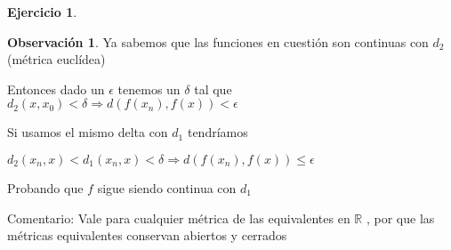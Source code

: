 \documentclass[11pt]{report}
\newcommand{\R}{\mathbb{R}}
\newcommand{\Ra}{\Rightarrow}
\theoremstyle{definition}
\newtheorem*{remark}{Observación}
\newtheorem{ej}{Ejercicio}
\begin{document}
\begin{ej}
\begin{enumerate}
\begin{remark}
				Ya sabemos que las funciones en cuestión son continuas con $d_2$ (métrica euclídea)

				Entonces dado un $\epsilon$ tenemos un $\delta$ tal que $d_2(x , x_0) < \delta \Ra d(f(x_n),f(x)) < \epsilon $  

				Si usamos el mismo delta con $d_1$ tendríamos

				$d_2(x_n,x) < d_1(x_n,x) < \delta \Ra d(f(x_n),f(x)) \leq \epsilon$

				Probando que $f$ sigue siendo continua con $d_1$

				Comentario: Vale para cualquier métrica de las equivalentes en $\R$ , por que las métricas equivalentes conservan abiertos y cerrados
				
				\end{remark}
		\end{enumerate}
	\end{ej}
	
\end{document}
